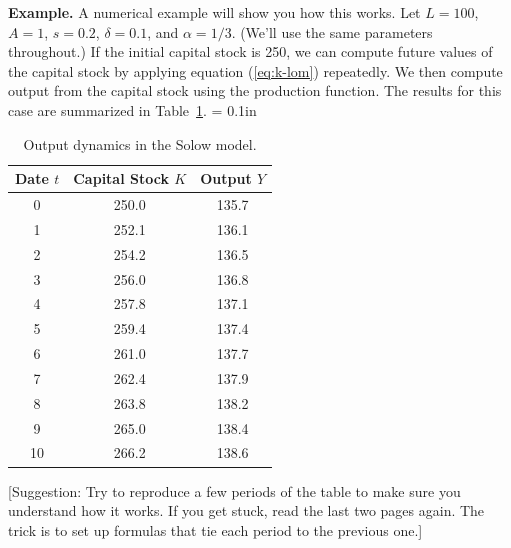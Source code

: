 \textbf{Example.} A numerical example will show you how this works.
Let $L = 100$, $ A = 1$, $s = 0.2$, $\delta = 0.1$, and $\alpha =
1/3$. (We'll use the same parameters throughout.) If the initial
capital stock is 250, we can compute future values of the capital
stock by applying equation (\ref{eq:k-lom}) repeatedly.
We then compute output from the capital
stock using the production function. The results for this case are
summarized in Table~\ref{tab:example}.
%
\tabcolsep = 0.1in
\begin{table}[t]
\centering
\caption{Output dynamics in the Solow model.}
\begin{tabular}{ccc}
\toprule
Date $t$  &  Capital Stock $K$ &  Output $Y$ \\
\midrule
    0 & 250.0 & 135.7 \\
    1 & 252.1 & 136.1 \\
    2 & 254.2 & 136.5 \\
    3 & 256.0 & 136.8 \\
    4 & 257.8 & 137.1 \\
    5 & 259.4 & 137.4 \\
    6 & 261.0 & 137.7 \\
    7 & 262.4 & 137.9 \\
    8 & 263.8 & 138.2 \\
    9 & 265.0 & 138.4 \\
   10\phantom{0} & 266.2 & 138.6 \\
\bottomrule
\end{tabular}
\label{tab:example}
\end{table}
%
[Suggestion:  Try to reproduce a few periods of the table to
make sure you understand how it works.
If you get stuck, read the last two pages again.
The trick is to set up formulas that tie each period to the previous one.]


